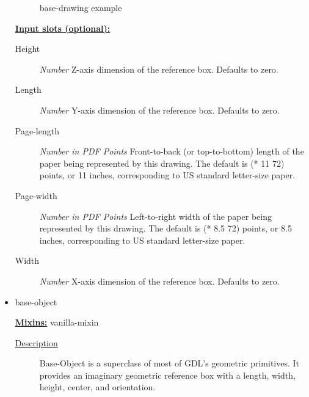 \documentclass [11pt]{book}
\begin{document}
\begin{itemize}
\begin{figure}
\caption{base-drawing example}

\label{fig:base-drawing}

\end{figure}





\textbf{
\underline{Input slots (optional):}}

\begin{description}

\item [Height]
\emph{Number} Z-axis dimension of the reference box. Defaults to zero.


\item [Length]
\emph{Number} Y-axis dimension of the reference box. Defaults to zero.


\item [Page-length]
\emph{Number in PDF Points} Front-to-back (or top-to-bottom) length of the paper being represented
by this drawing. The default is (* 11 72) points, or 11 inches, corresponding to US standard
letter-size paper.


\item [Page-width]
\emph{Number in PDF Points} Left-to-right width of the paper being represented by this drawing.
The default is (* 8.5 72) points, or 8.5 inches, corresponding to US standard letter-size paper.


\item [Width]
\emph{Number} X-axis dimension of the reference box. Defaults to zero.


\end{description}







\item {}base-object


\textbf{
\underline{Mixins:}} vanilla-mixin





\begin{description}

\item [
\underline{Description}]


Base-Object is a superclass of most of GDL's geometric primitives. It 
provides an imaginary geometric reference box with a length, width, height, center, 
and orientation.




\end{description}
\end{itemize}
\end{document}
